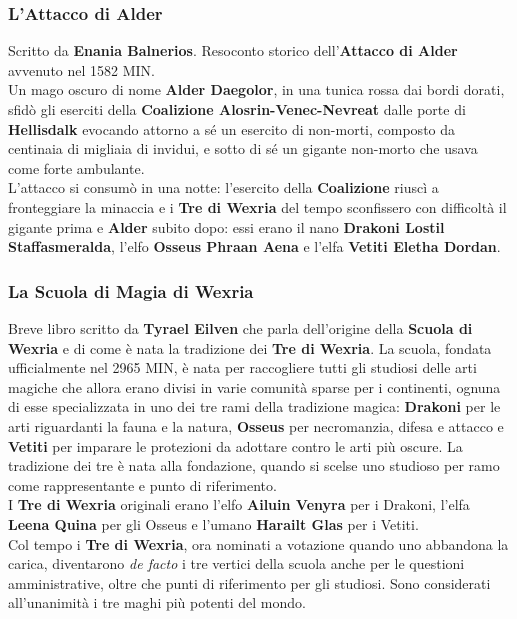\documentclass[10pt,twoside,onecolumn,openany]{book}
\begin{document}
\subsubsection{L'Attacco di Alder}
Scritto da \textbf{Enania Balnerios}. Resoconto storico dell'\textbf{Attacco di Alder} avvenuto nel 1582 MIN.\\
Un mago oscuro di nome \textbf{Alder Daegolor}, in una tunica rossa dai bordi dorati, sfidò gli eserciti della \textbf{Coalizione Alosrin-Venec-Nevreat} dalle porte di \textbf{Hellisdalk} evocando attorno a sé un esercito di non-morti, composto da centinaia di migliaia di invidui, e sotto di sé un gigante non-morto che usava come forte ambulante.\\
L'attacco si consumò in una notte: l'esercito della \textbf{Coalizione} riuscì a fronteggiare la minaccia e i \textbf{Tre di Wexria} del tempo sconfissero con difficoltà il gigante prima e \textbf{Alder} subito dopo: essi erano il nano \textbf{Drakoni Lostil Staffasmeralda}, l'elfo \textbf{Osseus Phraan Aena} e l'elfa \textbf{Vetiti Eletha Dordan}.\\
\subsubsection{La Scuola di Magia di Wexria}
Breve libro scritto da \textbf{Tyrael Eilven} che parla dell'origine della \textbf{Scuola di Wexria} e di come è nata la tradizione dei \textbf{Tre di Wexria}.
La scuola, fondata ufficialmente nel 2965 MIN, è nata per raccogliere tutti gli studiosi delle arti magiche che allora erano divisi in varie comunità sparse per i continenti, ognuna di esse specializzata in uno dei tre rami della tradizione magica: \textbf{Drakoni} per le arti riguardanti la fauna e la natura, \textbf{Osseus} per necromanzia, difesa e attacco e \textbf{Vetiti} per imparare le protezioni da adottare contro le arti più oscure. La tradizione dei tre è nata alla fondazione, quando si scelse uno studioso per ramo come rappresentante e punto di riferimento.\\
I \textbf{Tre di Wexria} originali erano l'elfo \textbf{Ailuin Venyra} per i Drakoni, l'elfa \textbf{Leena Quina} per gli Osseus e l'umano \textbf{Harailt Glas} per i Vetiti.\\
Col tempo i \textbf{Tre di Wexria}, ora nominati a votazione quando uno abbandona la carica, diventarono \textit{de facto} i tre vertici della scuola anche per le questioni amministrative, oltre che punti di riferimento per gli studiosi. Sono considerati all'unanimità i tre maghi più potenti del mondo.
\end{document}
